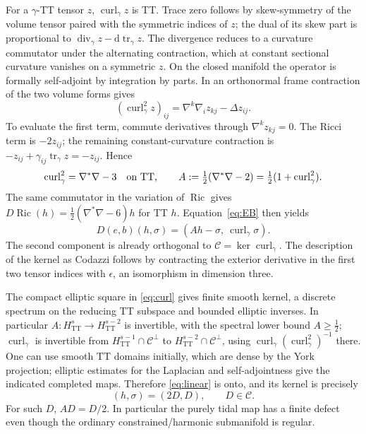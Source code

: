 \documentclass[11pt]{article}
\theoremstyle{remark}
\newcommand{\TT}{\mathrm{TT}}
\newcommand{\Curl}{\operatorname{curl}}
\newcommand{\Ric}{\operatorname{Ric}}
\newcommand{\tr}{\operatorname{tr}}
\newcommand{\divg}{\operatorname{div}}
\newcommand{\dd}{\mathrm{d}}
\newcommand{\C}{\mathcal C}
\begin{document}
For a \(\gamma\)-TT tensor \(z\), \(\Curl_\gamma z\) is TT. Trace zero follows by skew-symmetry of the volume tensor paired with the symmetric indices of \(z\); the dual of its skew part is proportional to \(\divg_\gamma z-\dd\tr_\gamma z\). The divergence reduces to a curvature commutator under the alternating contraction, which at constant sectional curvature vanishes on a symmetric \(z\). On the closed manifold the operator is formally self-adjoint by integration by parts. In an orthonormal frame contraction of the two volume forms gives
\[
 (\Curl_\gamma^2 z)_{ij}=\nabla^k\nabla_i z_{kj}-\Delta z_{ij}.
\]
To evaluate the first term, commute derivatives through \(\nabla^k z_{kj}=0\). The Ricci term is \(-2z_{ij}\); the remaining constant-curvature contraction is \(-z_{ij}+\gamma_{ij}\tr_\gamma z=-z_{ij}\). Hence
\begin{equation}
 \Curl_\gamma^2=\nabla^*\nabla-3 \quad\hbox{on TT},\qquad
 A:=\tfrac12(\nabla^*\nabla-2)=\tfrac12(1+\Curl_\gamma^2).
 \label{eq:curl}
\end{equation}
The same commutator in the variation of \(\Ric\) gives
\(D\Ric(h)=\tfrac12(\nabla^*\nabla-6)h\) for TT \(h\). Equation~\eqref{eq:EB} then yields
\begin{equation}
 D(e,b)(h,\sigma)=(Ah-\sigma,\ \Curl_\gamma\sigma).
 \label{eq:linear}
\end{equation}
The second component is already orthogonal to \(\C=\ker\Curl_\gamma\). The description of the kernel as Codazzi follows by contracting the exterior derivative in the first two tensor indices with \(\epsilon\), an isomorphism in dimension three.

The compact elliptic square in \eqref{eq:curl} gives finite smooth kernel, a discrete spectrum on the reducing TT subspace and bounded elliptic inverses. In particular \(A:H^s_{\TT}\to H^{s-2}_{\TT}\) is invertible, with the spectral lower bound \(A\geq \tfrac12\); \(\Curl_\gamma\) is invertible from \(H^{s-1}_{\TT}\cap\C^\perp\) to \(H^{s-2}_{\TT}\cap\C^\perp\), using \(\Curl_\gamma(\Curl_\gamma^2)^{-1}\) there. One can use smooth TT domains initially, which are dense by the York projection; elliptic estimates for the Laplacian and self-adjointness give the indicated completed maps. Therefore \eqref{eq:linear} is onto, and its kernel is precisely
\begin{equation}
        (h,\sigma)=(2D,D),\qquad D\in\C.
 \label{eq:kernel}
\end{equation}
For such \(D\), \(AD=D/2\). In particular the purely tidal map has a finite defect even though the ordinary constrained/harmonic submanifold is regular.
\end{document}
